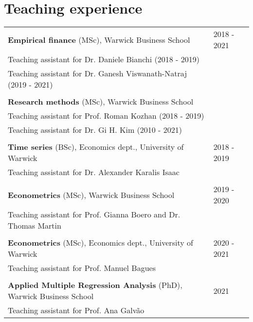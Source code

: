 \documentclass[a4paper,12pt]{article}
\begin{document}
\section{Teaching experience}
\begin{tabular*}{\linewidth}{@{}l@{\extracolsep{\fill}}l}
\textbf{Empirical finance} (MSc), Warwick Business School & 2018 - 2021\\[.25em]
\multicolumn{1}{l}{Teaching assistant for Dr. Daniele Bianchi (2018 - 2019)}\\
\multicolumn{1}{l}{Teaching assistant for Dr. Ganesh Viswanath-Natraj (2019 - 2021)}\\
\\[.25em]
\textbf{Research methods} (MSc), Warwick Business School \\[.25em]
\multicolumn{1}{l}{Teaching assistant for Prof. Roman Kozhan (2018 - 2019)}\\
\multicolumn{1}{l}{Teaching assistant for Dr. Gi H. Kim (2010 - 2021)}\\
\\[.25em]
\textbf{Time series} (BSc), Economics dept., University of Warwick & 2018 - 2019 \\[.25em]
\multicolumn{1}{l}{Teaching assistant for Dr. Alexander Karalis Isaac} \\
\\[.25em]
\textbf{Econometrics} (MSc), Warwick Business School & 2019 - 2020\\[.25em]
\multicolumn{1}{l}{Teaching assistant for Prof. Gianna Boero and Dr. Thomas Martin }\\
\\[.25em]
\textbf{Econometrics} (MSc), Economics dept.,  University of Warwick & 2020 - 2021\\[.25em]
\multicolumn{1}{l}{Teaching assistant for Prof. Manuel Bagues}\\
\\[.25em]
\textbf{Applied Multiple Regression Analysis} (PhD), Warwick Business School & 2021\\[.25em]
\multicolumn{1}{l}{Teaching assistant for Prof. Ana Galv\~ao}\\
\end{tabular*}
\end{document}
